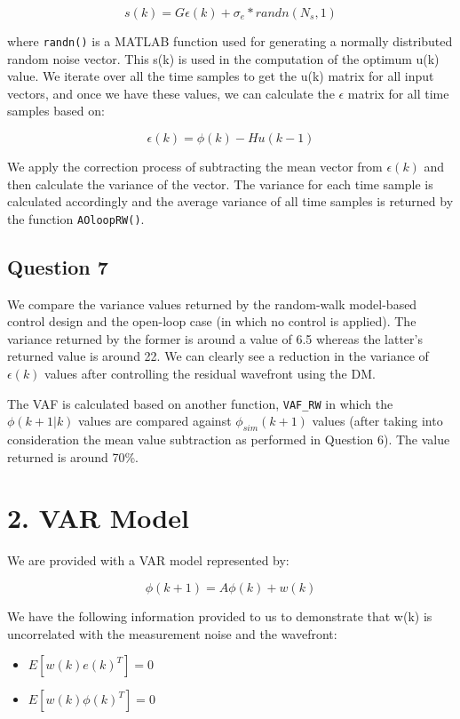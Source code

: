 \documentclass[12pt]{report}
\begin{document}
\begin{equation*}
s(k) = G\epsilon(k) + \sigma_{e}*randn(N_{s},1) 
\end{equation*}

where \texttt{randn()} is a MATLAB function used for generating a normally distributed random noise vector.
This s(k) is used in the computation of the optimum u(k) value.
We iterate over all the time samples to get the u(k) matrix for all input vectors, and once we have these values, we can calculate the $\epsilon$ matrix for all time samples based on: 

\begin{equation*}
\epsilon(k) = \phi(k) - Hu(k-1) 
\end{equation*}

We apply the correction process of subtracting the mean vector from $\epsilon(k)$ and then calculate the variance of the vector. The variance for each time sample is calculated accordingly and the average variance of all time samples is returned by the function \texttt{AOloopRW()}.

\subsection*{Question 7}

We compare the variance values returned by the random-walk model-based control design and the open-loop case (in which no control is applied). The variance returned by the former is around a value of 6.5 whereas the latter's returned value is around 22. We can clearly see a reduction in the variance of $\epsilon(k)$ values after controlling the residual wavefront using the DM.

The VAF is calculated based on another function, \texttt{VAF\_RW} in which the $\phi(k+1|k)$ values are compared against $\phi_{sim}(k+1)$ values (after taking into consideration the mean value subtraction as performed in Question 6). The value returned is around 70\%.

\section*{2. VAR Model}

We are provided with a VAR model represented by:

\begin{equation}\label{eq:var_eqn}
	\phi(k+1) = A\phi(k) + w(k)
\end{equation}

We have the following information provided to us to demonstrate that w(k) is uncorrelated with the measurement noise and the wavefront:
\begin{itemize}
\item $E\left[w(k)e(k)^{T}\right] = 0$
\item $E\left[w(k)\phi(k)^{T}\right] = 0$
\end{itemize}
\end{document}
